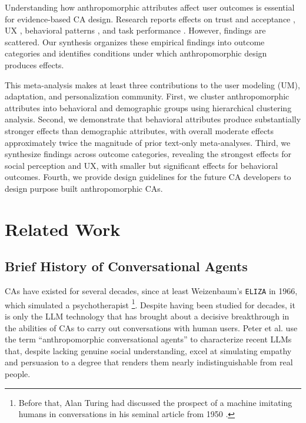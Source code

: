 \documentclass[manuscript,anonymous,sigconf]{acmart}
\begin{document}
Understanding how anthropomorphic attributes affect user outcomes is essential for evidence-based CA design. Research reports effects on trust and acceptance \citep{kraus_role_2021,chandra_be_2022}, UX \citep{lieb_student_2024,liu_older_2023}, behavioral patterns \citep{mehra_chatbot_2021,chen_you_2021}, and task performance \citep{zheldibayeva_genai_2025,baihaqi_rapport-driven_2024}. However, findings are scattered. Our synthesis organizes these empirical findings into outcome categories and identifies conditions under which anthropomorphic design produces effects.

This meta-analysis makes at least three contributions to the user modeling (UM), adaptation, and personalization community. First, we cluster anthropomorphic attributes into behavioral and demographic groups using hierarchical clustering analysis. Second, we demonstrate that behavioral attributes produce substantially stronger effects than demographic attributes, with overall moderate effects approximately twice the magnitude of prior text-only meta-analyses. Third, we synthesize findings across outcome categories, revealing the strongest effects for social perception and UX, with smaller but significant effects for behavioral outcomes. Fourth, we provide design guidelines for the future CA developers to design purpose built anthropomorphic CAs.

\section{Related Work}

\subsection{Brief History of Conversational Agents}
CAs have existed for several decades, since at least Weizenbaum's \texttt{ELIZA} in 1966, which simulated a psychotherapist \citep{weizenbaum_elizacomputer_1966}\footnote{Before that, Alan Turing had discussed the prospect of a machine imitating humans in conversations in his seminal article from 1950 \citep{turing_computing_1950}.}. Despite having been studied for decades, it is only the LLM technology that has brought about a decisive breakthrough in the abilities of CAs to carry out conversations with human users. Peter et al. \cite{peter_benefits_2025} use the term ``anthropomorphic conversational agents'' to characterize recent LLMs that, despite lacking genuine social understanding, excel at simulating empathy and persuasion to a degree that renders them nearly indistinguishable from real people. %
\end{document}
